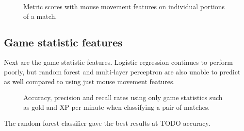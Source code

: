 \documentclass[Report.tex]{subfiles}
\newcommand{\baraxis}[7]{
\begin{axis}[
    ybar,
    title={#1},
    width=#5,
    height=#6,
    ymin=#3, ymax=#4,
    bar width=1em,
    legend style={at={#7},anchor=north,legend columns=-1},
    enlarge x limits=0.4,
    x tick label style={align=center,text width=1.7cm},
    symbolic x coords={Logistic Regression, Random Forest, Multi-layer Perceptron},
    xtick=data,
    ylabel={#2}
]
}
\newcommand{\plotbar}[5]{
\addplot+[
	discard if not={numSplits}{#1},
	discard if not={split}{#2},
	discard if not={features}{#3},
] table [x=model, y=#4,col sep=comma] {data/20-pair-cv.csv};
\addlegendentry{#5}
}
\newcommand{\lineaxis}[5]{
\begin{axis}[
    title={#1},
    width=#3,
    height=#4,
    legend style={at={#5},anchor=north,legend columns=-1},
    enlarge x limits=0.4,
	xlabel={Portion of match},
    ylabel={#2},
]
}
\newcommand{\plotline}[4]{
\addplot+[
	discard if not={numSplits}{5},
	discard if not={model}{#1},
	discard if not={features}{#2}
] table [x=split, y=#3, col sep=comma] {data/20-pair-cv.csv};
\addlegendentry{#4}
}
\begin{document}
\begin{figure}[H]
\centering
{}
\caption{Metric scores with mouse movement features on individual portions of a match. }
\end{figure}

\subsection{Game statistic features}
Next are the game statistic features. Logistic regression continues to perform poorly, but random forest and multi-layer perceptron are also unable to predict as well compared to using just mouse movement features. 

\begin{figure}[H]
\centering
{}
\caption{Accuracy, precision and recall rates using only game statistics such as gold and XP per minute when classifying a pair of matches.}
\end{figure}

The random forest classifier gave the best results at TODO accuracy. 
\end{document}
